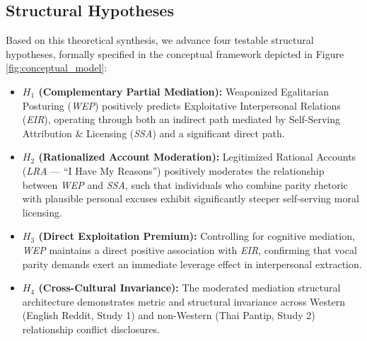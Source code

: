 \subsection{Structural Hypotheses}
Based on this theoretical synthesis, we advance four testable structural hypotheses, formally specified in the conceptual framework depicted in Figure \ref{fig:conceptual_model}:
\begin{itemize}[leftmargin=*]
    \item \textbf{$H_1$ (Complementary Partial Mediation):} Weaponized Egalitarian Posturing (\textit{WEP}) positively predicts Exploitative Interpersonal Relations (\textit{EIR}), operating through both an indirect path mediated by Self-Serving Attribution \& Licensing (\textit{SSA}) and a significant direct path.
    \item \textbf{$H_2$ (Rationalized Account Moderation):} Legitimized Rational Accounts (\textit{LRA} --- ``I Have My Reasons'') positively moderates the relationship between \textit{WEP} and \textit{SSA}, such that individuals who combine parity rhetoric with plausible personal excuses exhibit significantly steeper self-serving moral licensing.
    \item \textbf{$H_3$ (Direct Exploitation Premium):} Controlling for cognitive mediation, \textit{WEP} maintains a direct positive association with \textit{EIR}, confirming that vocal parity demands exert an immediate leverage effect in interpersonal extraction.
    \item \textbf{$H_4$ (Cross-Cultural Invariance):} The moderated mediation structural architecture demonstrates metric and structural invariance across Western (English Reddit, Study 1) and non-Western (Thai Pantip, Study 2) relationship conflict disclosures.
\end{itemize}

